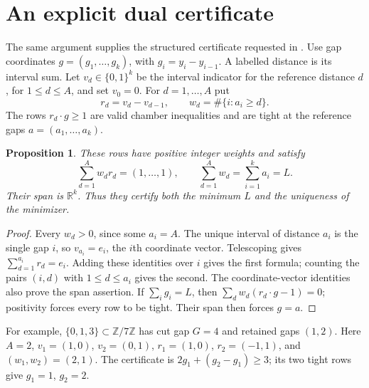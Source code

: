 \documentclass[11pt,a4paper]{article}
\newtheorem{proposition}[theorem]{Proposition}
\newcommand{\R}{\mathbb R}
\newcommand{\Z}{\mathbb Z}
\begin{document}
\section{An explicit dual certificate}

The same argument supplies the structured certificate requested in
\cite[Sections~7 and~10]{notik}.
Use gap coordinates $g=(g_1,\ldots,g_k)$, with
$g_i=y_i-y_{i-1}$. A labelled distance is its interval sum.
Let $v_d\in\{0,1\}^k$ be the interval indicator for the reference
distance $d$, for $1\le d\le A$, and set $v_0=0$.
For $d=1,\ldots,A$ put
\[
 r_d=v_d-v_{d-1},\qquad
 w_d=\#\{i:a_i\ge d\}.
\]
The rows $r_d\cdot g\ge1$ are valid chamber inequalities and are tight
at the reference gaps $a=(a_1,\ldots,a_k)$.

\begin{proposition}\label{prop:dual}
These rows have positive integer weights and satisfy
\[
 \sum_{d=1}^A w_dr_d=(1,\ldots,1),\qquad
 \sum_{d=1}^A w_d=\sum_{i=1}^k a_i=L.
\]
Their span is $\R^k$. Thus they certify both the minimum $L$ and
the uniqueness of the minimizer.
\end{proposition}
\begin{proof}
Every $w_d>0$, since some $a_i=A$.
The unique interval of distance $a_i$ is the single gap $i$, so
$v_{a_i}=e_i$, the $i$th coordinate vector. Telescoping gives
$\sum_{d=1}^{a_i}r_d=e_i$.
Adding these identities over $i$ gives the first formula; counting
the pairs $(i,d)$ with $1\le d\le a_i$ gives the second.
The coordinate-vector identities also prove the span assertion.
If $\sum_i g_i=L$, then
$\sum_d w_d(r_d\cdot g-1)=0$; positivity forces every row to be
tight. Their span then forces $g=a$.
\end{proof}

For example, $\{0,1,3\}\subset\Z/7\Z$ has cut gap $G=4$ and
retained gaps $(1,2)$. Here $A=2$, $v_1=(1,0)$,
$v_2=(0,1)$, $r_1=(1,0)$, $r_2=(-1,1)$, and $(w_1,w_2)=(2,1)$.
The certificate is $2g_1+(g_2-g_1)\ge3$;
its two tight rows give $g_1=1$, $g_2=2$.
\end{document}
